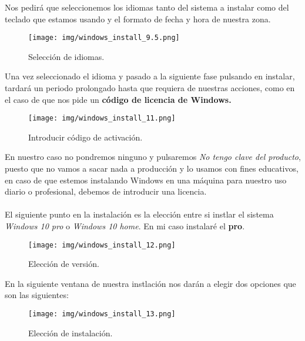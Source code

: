 \documentclass[12pt]{article}
\begin{document}
      Nos pedirá que seleccionemos los idiomas tanto del sistema a instalar como del teclado que estamos usando y
      el formato de fecha y hora de nuestra zona. 

      \begin{figure}[h]
        \centering
        \texttt{[image: img/windows\_install\_9.5.png]}
        \caption{Selección de idiomas.}
        \label{Windows5}
      \end{figure}
    
      \newpage

      Una vez seleccionado el idioma y pasado a la siguiente fase pulsando en instalar, tardará un periodo prolongado 
      hasta que requiera de nuestras acciones, como en el caso de que nos pide un \textbf{código de licencia de Windows.}
      
      \begin{figure}[h]
        \centering
        \texttt{[image: img/windows\_install\_11.png]}
        \caption{Introducir código de activación.}
        \label{Windows6}
      \end{figure}

      En nuestro caso no pondremos ninguno y pulsaremos \textit{No tengo clave del producto}, puesto que no vamos a sacar 
      nada a producción y lo usamos con fines educativos, en caso de que estemos instalando Windows en una máquina para 
      nuestro uso diario o profesional, debemos de introducir una licencia.
      \\\\
      El siguiente punto en la instalación es la elección entre si instlar el sistema \textit{Windows 10 pro} o \textit{Windows 10 home}.
      En mi caso instalaré el \textbf{pro}.
      \begin{figure}[h]
        \centering
        \texttt{[image: img/windows\_install\_12.png]}
        \caption{Elección de versión.}
        \label{Windows7}
      \end{figure}
      
      \newpage

      En la siguiente ventana de nuestra instlación nos darán a elegir dos opciones que son las siguientes:

      \begin{figure}[h]
        \centering
        \texttt{[image: img/windows\_install\_13.png]}
        \caption{Elección de instalación.}
        \label{Windows8}
      \end{figure}
\end{document}
